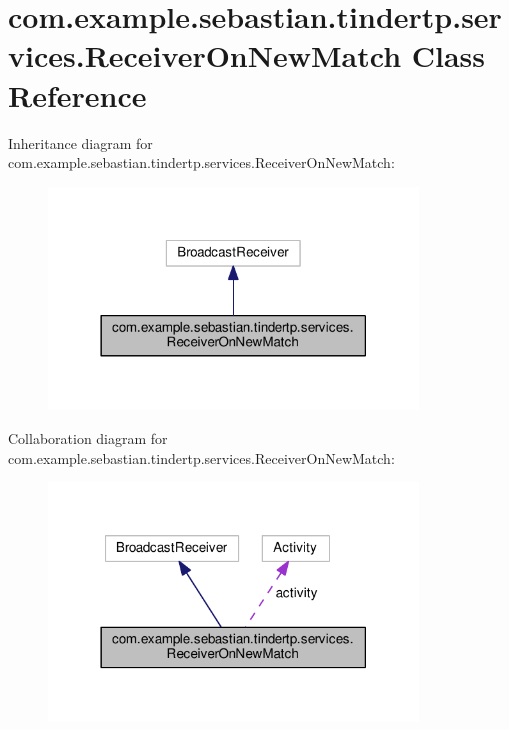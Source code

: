 \hypertarget{classcom_1_1example_1_1sebastian_1_1tindertp_1_1services_1_1ReceiverOnNewMatch}{}\section{com.\+example.\+sebastian.\+tindertp.\+services.\+Receiver\+On\+New\+Match Class Reference}
\label{classcom_1_1example_1_1sebastian_1_1tindertp_1_1services_1_1ReceiverOnNewMatch}


Inheritance diagram for com.\+example.\+sebastian.\+tindertp.\+services.\+Receiver\+On\+New\+Match\+:\nopagebreak
\begin{figure}[H]
\begin{center}
\leavevmode
\includegraphics[width=278pt]{classcom_1_1example_1_1sebastian_1_1tindertp_1_1services_1_1ReceiverOnNewMatch__inherit__graph}
\end{center}
\end{figure}


Collaboration diagram for com.\+example.\+sebastian.\+tindertp.\+services.\+Receiver\+On\+New\+Match\+:\nopagebreak
\begin{figure}[H]
\begin{center}
\leavevmode
\includegraphics[width=278pt]{classcom_1_1example_1_1sebastian_1_1tindertp_1_1services_1_1ReceiverOnNewMatch__coll__graph}
\end{center}
\end{figure}
